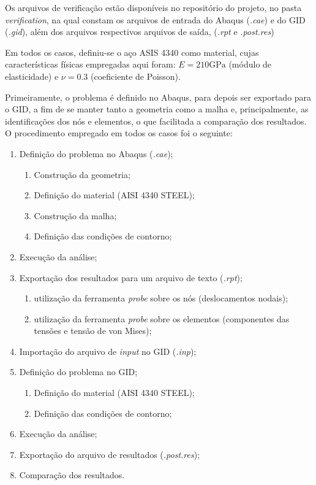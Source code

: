 Os arquivos de verificação estão disponíveis no repositório do projeto, no pasta \emph{verification}, na qual constam os arquivos de entrada do Abaqus (\emph{.cae}) e do GID (\emph{.gid}), além dos arquivos respectivos arquivos de saída, (\emph{.rpt} e \emph{.post.res})

Em todos os casos, definiu-se o aço ASIS 4340 como material, cujas características físicas empregadas aqui foram: $E = 210 \text{GPa}$ (módulo de elasticidade) e $\nu = 0.3$ (coeficiente de Poisson).

Primeiramente, o problema é definido no Abaqus, para depois ser exportado para o GID, a fim de se manter tanto a geometria como a malha e, principalmente, as identificações dos nós e elementos, o que facilitada a comparação dos resultados. O procedimento empregado em todos os casos foi o seguinte:

\begin{enumerate}
    \item Definição do problema no Abaqus (\emph{.cae});
    \begin{enumerate}
        \item Construção da geometria;
        \item Definição do material (AISI 4340 STEEL);
        \item Construção da malha;
        \item Definição das condições de contorno;
    \end{enumerate} 
    \item Execução da análise;
    \item Exportação dos resultados para um arquivo de texto (\emph{.rpt});
    \begin{enumerate}
        \item utilização da ferramenta \emph{probe} sobre os nós (deslocamentos nodais);
        \item utilização da ferramenta \emph{probe} sobre os elementos (componentes das tensões e tensão de von Mises);
    \end{enumerate}
    \item Importação do arquivo de \emph{input} no GID (\emph{.inp});
    \item Definição do problema no GID;
    \begin{enumerate}
        \item Definição do material (AISI 4340 STEEL);
        \item Definição das condições de contorno;
    \end{enumerate}
    \item Execução da análise;
    \item Exportação do arquivo de resultados (\emph{.post.res});
    \item Comparação dos resultados.
\end{enumerate}

